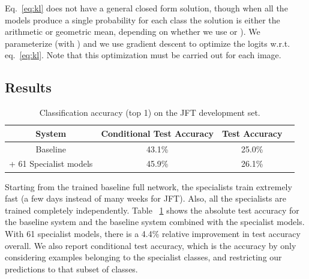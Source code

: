 Eq.~\ref{eq:kl} does not have a general closed form solution, though when all the models produce a single probability for
each class the solution is either the arithmetic or geometric mean, depending on whether we use 
or ). We parameterize  (with ) and we use gradient descent to optimize the logits \recordmath{\bz} w.r.t. eq.~\ref{eq:kl}. Note that this
optimization must be carried out for each image.  

\subsection{Results}

\begin{table}
\centering
\small
\begin{tabular}{|c|c|c|c|}
\hline
System & Conditional Test Accuracy & Test Accuracy \\
\hline
Baseline & 43.1\% & 25.0\%\\
 + 61 Specialist models & 45.9\%& 26.1\% \\
\hline
\end{tabular}
\caption{Classification accuracy (top 1) on the JFT development set.}\label{tab:image_results_spec}
\end{table}

Starting from the trained baseline full network,
the specialists train extremely fast (a few days instead of many weeks for JFT). Also, all the specialists
are trained completely independently.  Table ~\ref{tab:image_results_spec} shows the absolute test accuracy for the
baseline system and the baseline system combined with the specialist
models.  With 61 specialist models, there is a
4.4\% relative improvement in test accuracy overall. We also report conditional test accuracy, which is the accuracy by only considering examples belonging to the specialist classes, and restricting our predictions to that subset of classes.



